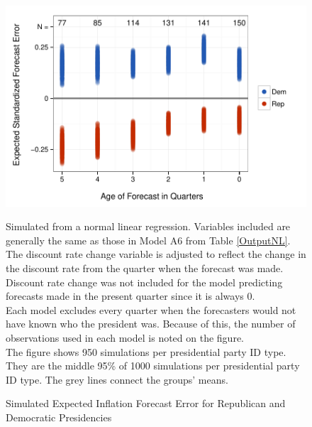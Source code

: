 \documentclass[a4paper]{article}\usepackage[]{graphicx}\usepackage[]{color}
\newenvironment{knitrout}{}{} %
\begin{document}
\begin{figure}[t]
    \caption{Simulated Expected Inflation Forecast Error for Republican and Democratic Presidencies}
    \label{ExpectValueParty}
    \begin{center}

\begin{knitrout}
\color{fgcolor}

{\centering \includegraphics[width=0.81\linewidth]{figure/ExpectValueParty} 

}



\end{knitrout}





    \end{center}
    \begin{singlespace}
        {\scriptsize{Simulated from a normal linear regression. Variables included are generally the same as those in Model A6 from Table \ref{OutputNL}. The discount rate change variable is adjusted to reflect the change in the discount rate from the quarter when the forecast was made. Discount rate change was not included for the model predicting forecasts made in the present quarter since it is always 0. \\ Each model excludes every quarter when the forecasters would not have known who the president was. Because of this, the number of observations used in each model is noted on the figure. \\ The figure shows 950 simulations per presidential party ID type. They are the middle 95\% of 1000 simulations per presidential party ID type. The grey lines connect the groups' means.}}
    \end{singlespace}
\end{figure}
\end{document}
